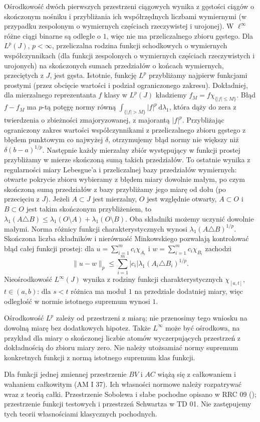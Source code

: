 Ośrodkowość dwóch pierwszych przestrzeni
ciągowych wynika z gęstości ciągów o skończonym
nośniku i przybliżania ich współrzędnych
liczbami wymiernymi (w przypadku zespolonym
o wymiernych częściach rzeczywistej i urojonej).
W $\ell^\infty$ różne ciągi binarne są
odległe o $1$, więc nie ma przeliczalnego
zbioru gęstego. Dla $L^p(J)$, $p<\infty$,
przeliczalna rodzina funkcji schodkowych
o wymiernych współczynnikach (dla funkcji
zespolonych o wymiernych częściach rzeczywistych
i urojonych) na skończonych
sumach przedziałów o końcach wymiernych,
przeciętych z $J$, jest gęsta.
Istotnie, funkcję $L^p$ przybliżamy
najpierw funkcjami prostymi (przez obcięcie
wartości i podział ograniczonego zakresu).
Dokładniej, dla mierzalnego reprezentanta $f$
klasy w $L^p(J)$ kładziemy $f_M=f\chi_{\{|f|\le M\}}$.
Błąd $f-f_M$ ma $p$-tą potęgę normy równą
$\int_{\{|f|>M\}}|f|^p\,\mathrm d\lambda_1$,
która dąży do zera z twierdzenia o zbieżności
zmajoryzowanej, z majorantą $|f|^p$.
Przybliżając ograniczony zakres wartości
współczynnikami z przeliczalnego zbioru
gęstego z błędem punktowym co najwyżej
$\delta$, otrzymujemy błąd normy nie większy
niż $\delta(b-a)^{1/p}$.
Następnie każdy mierzalny zbiór występujący
w funkcji prostej przybliżamy w mierze
skończoną sumą takich przedziałów.
To ostatnie wynika z regularności miary
Lebesgue'a i przeliczalnej bazy przedziałów
wymiernych: otwarte pokrycie zbioru wybieramy
z błędem miary dowolnie małym, po czym
skończoną sumą przedziałów z bazy
przybliżamy jego miarę od dołu (po przecięciu
z $J$). Jeżeli $A\subset J$ jest mierzalny,
$O$ jest względnie otwarty, $A\subset O$
i $B\subset O$ jest takim skończonym
przybliżeniem, to
$\lambda_1(A\triangle B)\le
\lambda_1(O\setminus A)+\lambda_1(O\setminus B)$.
Oba składniki możemy uczynić dowolnie małymi.
Norma różnicy funkcji charakterystycznych
wynosi $\lambda_1(A\triangle B)^{1/p}$.
Skończona liczba składników i nierówność
Minkowskiego pozwalają kontrolować błąd
całej funkcji prostej: dla
$u=\sum_{i=1}^m c_i\chi_{A_i}$ i
$w=\sum_{i=1}^m c_i\chi_{B_i}$ zachodzi
\[
 \|u-w\|_p\le
 \sum_{i=1}^m |c_i|\lambda_1(A_i\triangle B_i)^{1/p}.
\]
Nieośrodkowość $L^\infty(J)$ wynika z rodziny
funkcji charakterystycznych $\chi_{[a,t]}$,
$t\in(a,b)$: dla $s<t$ różnica ma moduł
$1$ na przedziale dodatniej miary,
więc odległość w normie istotnego supremum
wynosi $1$.

Ośrodkowość $L^p$ zależy od przestrzeni
z miarą; nie przenosimy tego wniosku
na dowolną miarę bez dodatkowych hipotez.
Także $L^\infty$ może być ośrodkowa,
na przykład dla miary o skończonej liczbie
atomów wyczerpujących przestrzeń z dokładnością
do zbioru miary zero. Nie należy utożsamiać
normy supremum konkretnych funkcji
z normą istotnego supremum klas funkcji.

Dla funkcji jednej zmiennej przestrzenie
$BV$ i $AC$ wiążą się z całkowaniem
i wahaniem całkowitym (AM I 37).
Ich własności normowe należy rozpatrywać
wraz z teorią całki. Przestrzenie Sobolewa
i słabe pochodne opisano w RRC 09
(); przestrzenie
funkcji testowych i przestrzeń Schwartza
w TD 01. Nie zastępujemy tych teorii
własnościami klasycznych pochodnych.
